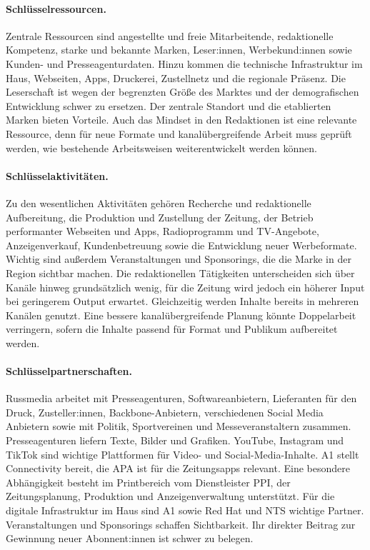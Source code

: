 \paragraph*{Schlüsselressourcen.}
Zentrale Ressourcen sind angestellte und freie Mitarbeitende, redaktionelle Kompetenz, starke und bekannte Marken, Leser:innen, Werbekund:innen sowie Kunden- und Presseagenturdaten. Hinzu kommen die technische Infrastruktur im Haus, Webseiten, Apps, Druckerei, Zustellnetz und die regionale Präsenz. Die Leserschaft ist wegen der begrenzten Größe des Marktes und der demografischen Entwicklung schwer zu ersetzen. Der zentrale Standort und die etablierten Marken bieten Vorteile. Auch das Mindset in den Redaktionen ist eine relevante Ressource, denn für neue Formate und kanalübergreifende Arbeit muss geprüft werden, wie bestehende Arbeitsweisen weiterentwickelt werden können.

\paragraph*{Schlüsselaktivitäten.}
Zu den wesentlichen Aktivitäten gehören Recherche und redaktionelle Aufbereitung, die Produktion und Zustellung der Zeitung, der Betrieb performanter Webseiten und Apps, Radioprogramm und TV-Angebote, Anzeigenverkauf, Kundenbetreuung sowie die Entwicklung neuer Werbeformate. Wichtig sind außerdem Veranstaltungen und Sponsorings, die die Marke in der Region sichtbar machen. Die redaktionellen Tätigkeiten unterscheiden sich über Kanäle hinweg grundsätzlich wenig, für die Zeitung wird jedoch ein höherer Input bei geringerem Output erwartet. Gleichzeitig werden Inhalte bereits in mehreren Kanälen genutzt. Eine bessere kanalübergreifende Planung könnte Doppelarbeit verringern, sofern die Inhalte passend für Format und Publikum aufbereitet werden.

\paragraph*{Schlüsselpartnerschaften.}
Russmedia arbeitet mit Presseagenturen, Softwareanbietern, Lieferanten für den Druck, Zusteller:innen, Backbone-Anbietern, verschiedenen Social Media Anbietern sowie mit Politik, Sportvereinen und Messeveranstaltern zusammen. Presseagenturen liefern Texte, Bilder und Grafiken. YouTube, Instagram und TikTok sind wichtige Plattformen für Video- und Social-Media-Inhalte. A1 stellt Connectivity bereit, die APA ist für die Zeitungsapps relevant. Eine besondere Abhängigkeit besteht im Printbereich vom Dienstleister PPI, der Zeitungsplanung, Produktion und Anzeigenverwaltung unterstützt. Für die digitale Infrastruktur im Haus sind A1 sowie Red Hat und NTS wichtige Partner. Veranstaltungen und Sponsorings schaffen Sichtbarkeit. Ihr direkter Beitrag zur Gewinnung neuer Abonnent:innen ist schwer zu belegen.


